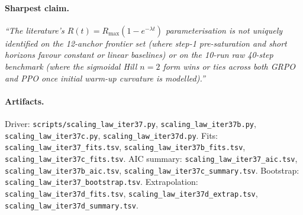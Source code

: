 \paragraph{Sharpest claim.}
\textit{``The literature's $R(t) = R_{\max}(1 - e^{-\lambda t})$
parameterisation is not uniquely identified on the 12-anchor frontier
set (where step-1 pre-saturation and short horizons favour constant or
linear baselines) or on the 10-run raw 40-step benchmark (where the
sigmoidal Hill $n=2$ form wins or ties across both GRPO and PPO once
initial warm-up curvature is modelled).''}

\paragraph{Artifacts.}
Driver: \texttt{scripts/scaling\_law\_iter37.py},
\texttt{scaling\_law\_iter37b.py},
\texttt{scaling\_law\_iter37c.py},
\texttt{scaling\_law\_iter37d.py}.
Fits: \texttt{scaling\_law\_iter37\_fits.tsv},
\texttt{scaling\_law\_iter37b\_fits.tsv},
\texttt{scaling\_law\_iter37c\_fits.tsv}.
AIC summary: \texttt{scaling\_law\_iter37\_aic.tsv},
\texttt{scaling\_law\_iter37b\_aic.tsv},
\texttt{scaling\_law\_iter37c\_summary.tsv}.
Bootstrap: \texttt{scaling\_law\_iter37\_bootstrap.tsv}.
Extrapolation: \texttt{scaling\_law\_iter37d\_fits.tsv},
\texttt{scaling\_law\_iter37d\_extrap.tsv},
\texttt{scaling\_law\_iter37d\_summary.tsv}.
